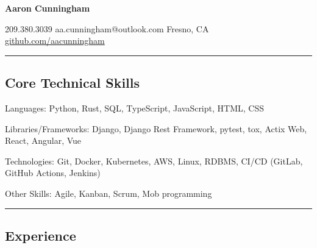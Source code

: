 \documentclass[11pt,letterpaper]{article}
\newenvironment{indentsection}[1]%
{\begin{list}{}%
    {\setlength{\leftmargin}{#1}}%
    \item[]%
}
{\end{list}}
\newcommand{\innerbullet}
{\hspace{0.6em}\textbullet\hspace{0.6em}}
\begin{document}
\begin{center}
    {\huge \textbf{Aaron Cunningham}}

    209.380.3039\innerbullet
    aa.cunningham@outlook.com\innerbullet
    Fresno, CA\\
    \href{https://github.com/aacunningham}{github.com/aacunningham}
\end{center}


\hrule
\vspace{-0.4em}
\subsection*{Core Technical Skills}

\begin{indentsection}{\parindent}
    \begin{description*}
        \item[Languages:]
            Python, Rust, SQL, TypeScript, JavaScript, HTML, CSS
        \item[Libraries/Frameworks:]
            Django, Django Rest Framework, pytest, tox, Actix Web, React, Angular, Vue
        \item[Technologies:]
            Git, Docker, Kubernetes, AWS, Linux, RDBMS, CI/CD (GitLab, GitHub Actions, Jenkins)
        \item[Other Skills:]
            Agile, Kanban, Scrum, Mob programming
    \end{description*}
\end{indentsection}


\hrule
\vspace{-0.4em}
\subsection*{Experience}
\end{document}
